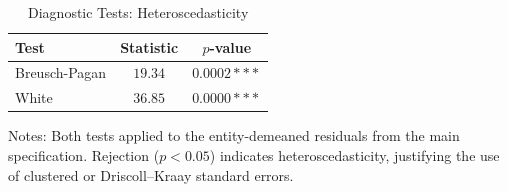 \begin{table}[htbp]\centering
\caption{Diagnostic Tests: Heteroscedasticity}
\label{tab:het_tests}
\begin{tabular}{lcc}
\toprule
Test & Statistic & $p$-value \\
\midrule
Breusch-Pagan & $19.34$ & $0.0002 ***$ \\
White & $36.85$ & $0.0000 ***$ \\
\bottomrule
\end{tabular}
\begin{tablenotes}\small
\item Notes: Both tests applied to the entity-demeaned residuals from the
main specification. Rejection ($p < 0.05$) indicates heteroscedasticity,
justifying the use of clustered or Driscoll--Kraay standard errors.
\end{tablenotes}
\end{table}